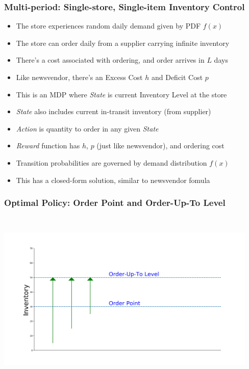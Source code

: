 \documentclass[handout]{beamer}
\begin{document}
\begin{frame}
\frametitle{Multi-period: Single-store, Single-item Inventory Control}
\pause
\begin{itemize}[<+->]
\item The store experiences random daily demand given by PDF $f(x)$
\item The store can order daily from a supplier carrying infinite inventory
\item There's a cost associated with ordering, and order arrives in $L$ days
\item Like newsvendor, there's an Excess Cost $h$ and Deficit Cost $p$
\item This is an MDP where {\em State} is current Inventory Level at the store
\item {\em State} also includes current in-transit inventory (from supplier)
\item {\em Action} is quantity to order in any given {\em State}
\item {\em Reward} function has $h$, $p$ (just like newsvendor), and ordering cost
\item Transition probabilities are governed by demand distribution $f(x)$
\item This has a closed-form solution, similar to newsvendor fomula
\end{itemize}
\end{frame}

\begin{frame}
\frametitle{Optimal Policy: Order Point and Order-Up-To Level}
\includegraphics[width=12.5cm, height=8.5cm]{op_otl.png}
\end{frame}
\end{document}
